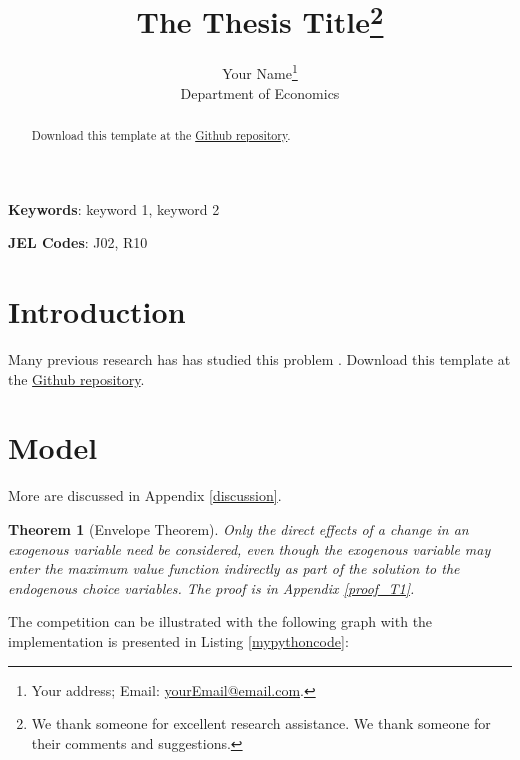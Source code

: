 \documentclass[11pt, letterpaper]{article}
\title{The Thesis Title\thanks{We thank someone for excellent research assistance. We thank someone for their comments and suggestions.}}
\author{Your Name\thanks{Your address; Email: \href{mailto:yourEmail@email.com}{yourEmail@email.com}.}\\
Department of Economics}
\date{\the\year{}}
\newtheorem{theorem}{Theorem}
\begin{document}
\maketitle
\vspace*{1cm}

\doublespacing

\begin{abstract}
  \lipsum[3] Download this template at the \href{https://github.com/howardhsumail/Thesis-LaTeX-Template.git}{Github repository}.
\end{abstract}
\vspace*{2cm}

\textbf{Keywords}: keyword 1, keyword 2

\textbf{JEL Codes}: J02, R10
\clearpage

\section{Introduction}
\lipsum[4] Many previous research has has studied this problem \citep{Lee2018, DS2018}. Download this template at the \href{https://github.com/howardhsumail/Thesis-LaTeX-Template.git}{Github repository}.

\section{Model}
\lipsum[5] More are discussed in Appendix \ref{discussion}.

\begin{theorem}[Envelope Theorem]
  Only the direct effects of a change in an exogenous variable need be considered, even though the exogenous variable may enter the maximum value function indirectly as part of the solution to the endogenous choice variables. The proof is in Appendix \ref{proof_T1}.
\end{theorem}

The {\color{mycolor}competition} can be illustrated with the following graph with the implementation is presented in Listing \ref{mypythoncode}:
\end{document}
